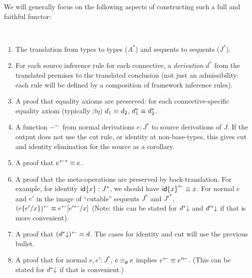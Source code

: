 \newcommand\backtrf[1]{\ensuremath{#1^{\leftarrow}}}
\newcommand\backtr[1]{\ensuremath{#1^{\Leftarrow}}}
\newcommand\str[2]{\ensuremath{\dsd{str}_{#1}(#2)}}

We will generally focus on the following aspects of constructing such a
full and faithful functor:
\begin{definition} ~
\begin{enumerate}
\item The translation from types to types ($A^*$) and sequents to
  sequents ($J^*$).

\item For each source inference rule for each connective, a
  \emph{derivation} $d^*$ from the translated premises to the translated
  conclusion (not just an admissibility: each rule will be defined by a
  composition of framework inference rules).

\item A proof that equality axioms are preserved: for each
  connective-specific equality axiom (typically $\beta\eta$) $d_1 \equiv
  d_2$, $d_1^* \equiv d_2^*$.

\item A function \backtrf{-} from normal derivations $e : J^*$ to source
  derivations of $J$.  If the output does not use the cut rule, or
  identity at non-base-types, this gives cut and identity elimination
  for the source as a corollary.

\item A proof that ${\backtrf{e}}^* \deq e$.  

\item A proof that the meta-operations are preserved by
  back-translation.  For example, for identity ${\mathsf{id}\{x\}} : J^*$, we
  should have $\backtrf{\Identa{x}} \deq x$.  For normal $e$ and $e'$ in
  the image of ``cutable'' sequents $J^*$ and $J'^*$,
  $\backtrf{(\Cuta{e}{e'}{x})} \deq \backtrf{e}[\backtrf{e'}/x]$ (Note:
  this can be stated for $d^*\mathord{\downarrow}$ and $d'^*\mathord{\downarrow}$ if that is more
  convenient).

\item A proof that $\backtrf{(\elim{d^*})} \deq d$.  The cases for
  identity and cut will use the previous bullet.

\item A proof that for normal $e,e' : J^*$, $e \equiv_{\mathsf{p}} e$ implies
  $\backtrf{e} \deq \backtrf{e'}$.  (This can be stated for
  $d^*\mathord{\downarrow}$ if that is convenient.)
\end{enumerate}
\end{definition}

